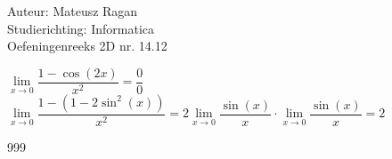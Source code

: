 \documentclass[a4paper]{article}
\begin{document}
\noindent \large Auteur: Mateusz Ragan \\
\noindent \large Studierichting: Informatica\\
\noindent \large Oefeningenreeks 2D nr. 14.12\\

\medskip

\normalsize

$\lim\limits_{x\rightarrow 0} \dfrac{1-\cos(2x)}{x^2} = \dfrac{0}{0}$\\   

$\lim\limits_{x\rightarrow 0} \dfrac{1-(1-2\sin^2(x))}{x^2} = 2 \lim\limits_{x\rightarrow 0} \dfrac{\sin(x)}{x} \cdot \lim\limits_{x\rightarrow 0} \dfrac{\sin(x)}{x} = 2$

\begin{thebibliography}{999}
\end{thebibliography}
\end{document}
